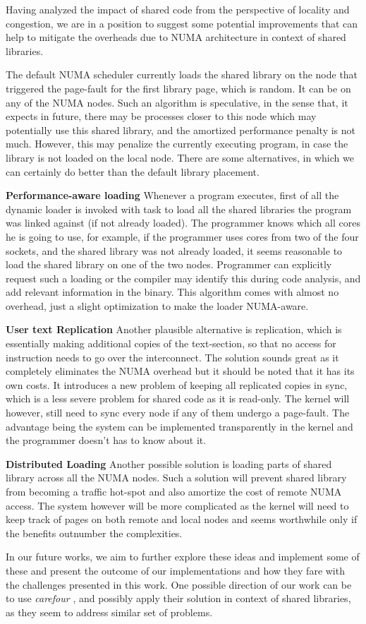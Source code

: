 
Having analyzed the impact of shared code from the perspective of locality and congestion,
we are in a position to suggest some potential improvements that can help to mitigate the
overheads due to NUMA architecture in context of shared libraries.

The default NUMA scheduler currently loads the shared library on the node that triggered
the page-fault for the first library page, which is random. It can be on any of the NUMA nodes.
Such an algorithm is speculative, in the sense that, it expects in future, there may be processes
closer to this node which may potentially use this shared library, and the amortized performance
penalty is not much. However, this may penalize the currently executing program, in case the library
is not loaded on the local node. There are some alternatives, in which we can certainly do better
than the default library placement.

\textbf{Performance-aware loading} Whenever a program executes, first of all the dynamic loader is
invoked with task to load all the shared libraries the program was linked against (if not already loaded).
The programmer knows which all cores he is going to use, for example, if the programmer uses cores from 
two of the four sockets, and the shared library was not already loaded, it seems reasonable to load
the shared library on one of the two nodes. Programmer can explicitly request such a loading or the
compiler may identify this during code analysis, and add relevant information in the binary. This
algorithm comes with almost no overhead, just a slight optimization to make the loader NUMA-aware.

\textbf{User text Replication} Another plausible alternative is replication, which is essentially making
additional copies of the text-section, so that no access for instruction needs to go over the interconnect.
The solution sounds great as it completely eliminates the NUMA overhead but it should be noted that it has
its own costs. It introduces a new problem of keeping all replicated copies in sync, which is a less severe
problem for shared code as it is read-only. The kernel will however, still need to sync every node if any 
of them undergo a page-fault. The advantage being the system can be implemented transparently in the
kernel and the programmer doesn't has to know about it.

\textbf{Distributed Loading} Another possible solution is loading parts of shared library across all the
NUMA nodes. Such a solution will prevent shared library from becoming a traffic hot-spot and also amortize
the cost of remote NUMA access. The system however will be more complicated as the kernel will need to
keep track of pages on both remote and local nodes and seems worthwhile only if the benefits outnumber the
complexities.

In our future works, we aim to further explore these ideas and implement some of these and present the
outcome of our implementations and how they fare with the challenges presented in this work. One possible
direction of our work can be to use \textit{carefour} \cite{Dashti:2013:TMH:2490301.2451157}, and possibly 
apply their solution in context of shared libraries, as they seem to address similar set of problems.

